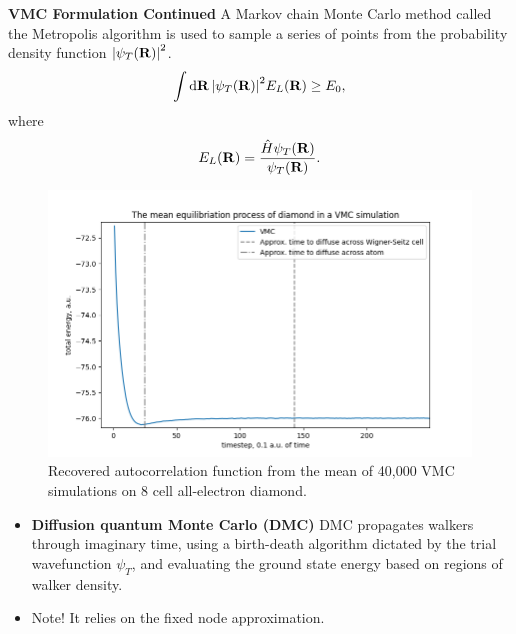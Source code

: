 \documentclass[10pt]{beamer}
\begin{document}
\begin{frame}[allowframebreaks]
    \textbf{VMC Formulation Continued}\medskip\newline
    A Markov chain Monte Carlo method called the Metropolis algorithm is used
    to sample a series of points from the probability density function
    $\vqty{\psi_T\pqty{\vb{R}}}^2$.\medskip\newline
    \begin{equation}
        \int\dd{\vb{R}}
        \vqty{\psi_T\pqty{\vb{R}}}^2
        E_L\pqty{\vb{R}}
        \geq E_0,
    \end{equation}
    where
    \begin{equation}
        E_L\pqty{\vb{R}}=\frac{\hat{H}\psi_T\pqty{\vb{R}}}{\psi_T\pqty{\vb{R}}}.
    \end{equation}
    \framebreak

    \begin{figure}
        \centering
        \includegraphics[scale=0.37]{./images/control_process_diamond_ae2.png}
        \caption{Recovered autocorrelation function from the mean of 40,000
        VMC simulations on 8 cell all-electron diamond.}
    \end{figure}
    \framebreak

    \begin{itemize}
        \item[\textbullet] \textbf{Diffusion quantum Monte Carlo (DMC)}\newline
        DMC propagates walkers through imaginary time, using a birth-death
        algorithm dictated by the trial wavefunction $\psi_T$, and evaluating
        the ground state energy based on regions of walker density.
        \item Note! It relies on the fixed node approximation.
    \end{itemize}
    \framebreak


\end{frame}
\end{document}
